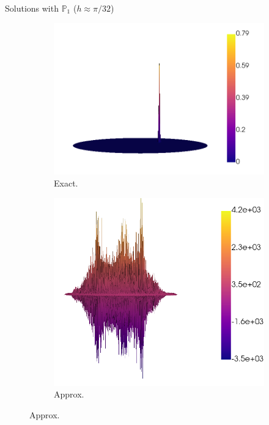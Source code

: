 \begin{frame}{Solutions with $\mathbb{P}_1$ ($h\approx \pi/32$)}
	\begin{figure}[h!]
		\begin{subfigure}{0.49\textwidth}
			\centering
			\includegraphics[scale=0.2]{img/Conveccion_Reaccion/strong/conv_react_u_ex_nx-64.png}
			\caption{Exact.}
		\end{subfigure}
		\begin{subfigure}{0.49\textwidth}
			\centering
			\includegraphics[scale=0.2]{img/Conveccion_Reaccion/strong/conv_react_u_FE_nx-64.png}
			\caption{Approx.}
		\end{subfigure}
	\end{figure}
	\end{frame}
